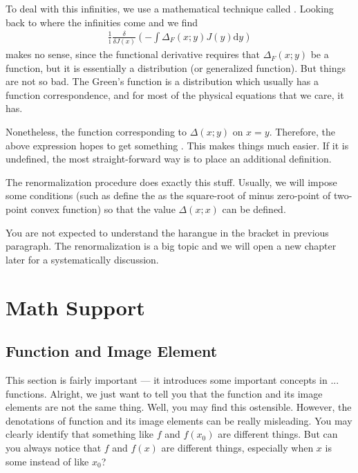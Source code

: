 \documentclass[letterpaper,10pt,english]{sphinxmanual}
\begin{document}
To deal with this infinities, we use a mathematical technique called . Looking back to where the infinities come and we find
\begin{equation*}
\begin{split}\frac{1}{\mathrm{i}}\!\frac{\delta}{\delta J(x)}(-\int\Delta_F(x;y)J(y)\mathrm{d}y)\end{split}
\end{equation*}
makes no sense, since the functional derivative requires that \(\Delta_F(x;y)\) be a function, but it is essentially a distribution (or generalized function). But things are not so bad. The Green's function is a distribution which usually has a function correspondence, and for most of the physical equations that we care, it has.

Nonetheless, the function corresponding to \(\Delta(x;y)\)  on \(x=y\). Therefore, the above expression hopes to get something . This makes things much easier. If it is undefined, the most straight-forward way is to place an additional definition.

The renormalization procedure does exactly this stuff. Usually, we will impose some conditions (such as define the  as the square-root of minus zero-point of two-point convex function) so that the value \(\Delta(x;x)\) can be defined.

You are not expected to understand the harangue in the bracket in previous paragraph. The renormalization is a big topic and we will open a new chapter later for a systematically discussion.


\chapter{Math Support}
\label{\detokenize{mathsup:math-support}}\label{\detokenize{mathsup::doc}}

\section{Function and Image Element}
\label{\detokenize{ms_func_img::doc}}\label{\detokenize{ms_func_img:function-and-image-element}}
This section is fairly important --- it introduces some important concepts in ... functions. Alright, we just want to tell you that the function and its image elements are not the same thing. Well, you may find this ostensible. However, the denotations of function and its image elements can be really misleading. You may clearly identify that something like \(f\) and \(f(x_0)\) are different things. But can you always notice that \(f\) and \(f(x)\) are different things, especially when \(x\) is some  instead of  like \(x_0\)?
\end{document}
